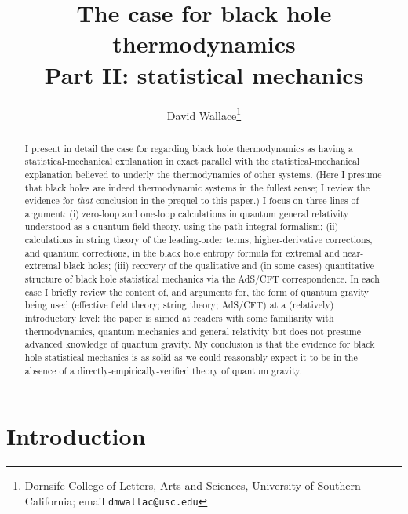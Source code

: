 \documentclass{article}
\begin{document}
\title{The case for black hole thermodynamics \\  Part II: statistical mechanics}
\author{David Wallace\thanks{Dornsife College of Letters, Arts and Sciences, University of Southern California; email \texttt{dmwallac@usc.edu}}}
\maketitle

\begin{abstract}
I present in detail the case for regarding black hole thermodynamics as having a statistical-mechanical explanation in exact parallel with the statistical-mechanical explanation believed to underly the thermodynamics of other systems. (Here I presume that black holes are indeed thermodynamic systems in the fullest sense; I review the evidence for \emph{that} conclusion in the prequel to this paper.) I focus on three lines of argument: (i) zero-loop and one-loop calculations in quantum general relativity understood as a quantum field theory, using the path-integral formalism; (ii) calculations in string theory of the leading-order terms, higher-derivative corrections, and quantum corrections, in the black hole entropy formula for extremal and near-extremal black holes; (iii) recovery of the qualitative and (in some cases) quantitative structure of black hole statistical mechanics via the AdS/CFT correspondence. In each case I briefly review the content of, and arguments for, the form of quantum gravity being used (effective field theory; string theory; AdS/CFT) at a (relatively) introductory level: the paper is aimed at readers with some familiarity with thermodynamics, quantum mechanics and general relativity but does not presume advanced knowledge of quantum gravity. My conclusion is that the evidence for black hole statistical mechanics is as solid as we could reasonably expect it to be in the absence of a directly-empirically-verified theory of quantum gravity.
\end{abstract}



\section{Introduction}\label{introduction}
\end{document}
